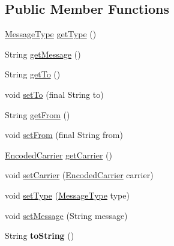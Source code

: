\subsection*{Public Member Functions}
\begin{DoxyCompactItemize}
\item 
\hyperlink{enumgov_1_1fnal_1_1ppd_1_1dd_1_1chat_1_1MessageType}{Message\-Type} \hyperlink{classgov_1_1fnal_1_1ppd_1_1dd_1_1xml_1_1MessageCarrierXML_a67e07c65dac7784dd9f588c7f6e196bc}{get\-Type} ()
\item 
String \hyperlink{classgov_1_1fnal_1_1ppd_1_1dd_1_1xml_1_1MessageCarrierXML_a72b6cda472fe1c4cccda6ba615066ac4}{get\-Message} ()
\item 
String \hyperlink{classgov_1_1fnal_1_1ppd_1_1dd_1_1xml_1_1MessageCarrierXML_a9271c022bfa138f9ffe77ba1cd6c8e4b}{get\-To} ()
\item 
void \hyperlink{classgov_1_1fnal_1_1ppd_1_1dd_1_1xml_1_1MessageCarrierXML_ab0e5444b53900394f5d26b7d2519d0ce}{set\-To} (final String to)
\item 
String \hyperlink{classgov_1_1fnal_1_1ppd_1_1dd_1_1xml_1_1MessageCarrierXML_a2fcf5297682388eed4d8c6040615716e}{get\-From} ()
\item 
void \hyperlink{classgov_1_1fnal_1_1ppd_1_1dd_1_1xml_1_1MessageCarrierXML_a11a7ff02e1101365fdb4fe37b4bc93f2}{set\-From} (final String from)
\item 
\hyperlink{classgov_1_1fnal_1_1ppd_1_1dd_1_1xml_1_1EncodedCarrier}{Encoded\-Carrier} \hyperlink{classgov_1_1fnal_1_1ppd_1_1dd_1_1xml_1_1MessageCarrierXML_a26b457c93da2d8bee90d72709daa5224}{get\-Carrier} ()
\item 
void \hyperlink{classgov_1_1fnal_1_1ppd_1_1dd_1_1xml_1_1MessageCarrierXML_a05768eb665e8a71ac99751d806fde117}{set\-Carrier} (\hyperlink{classgov_1_1fnal_1_1ppd_1_1dd_1_1xml_1_1EncodedCarrier}{Encoded\-Carrier} carrier)
\item 
void \hyperlink{classgov_1_1fnal_1_1ppd_1_1dd_1_1xml_1_1MessageCarrierXML_ae967936411dbc84d68dfb9fb3440fb47}{set\-Type} (\hyperlink{enumgov_1_1fnal_1_1ppd_1_1dd_1_1chat_1_1MessageType}{Message\-Type} type)
\item 
void \hyperlink{classgov_1_1fnal_1_1ppd_1_1dd_1_1xml_1_1MessageCarrierXML_a889172c2f8619ea318ad210dc679623c}{set\-Message} (String message)
\item 
\hypertarget{classgov_1_1fnal_1_1ppd_1_1dd_1_1xml_1_1MessageCarrierXML_aac248673a922f122741b65cf13256d09}{String {\bfseries to\-String} ()}\label{classgov_1_1fnal_1_1ppd_1_1dd_1_1xml_1_1MessageCarrierXML_aac248673a922f122741b65cf13256d09}


\end{DoxyCompactItemize}
